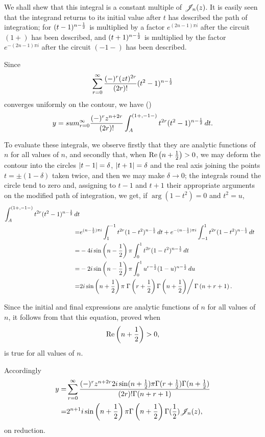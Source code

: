 \documentclass{book}
\begin{document}
We shall shew that this integral is a constant multiple of $\mathscr{J}_n(z)$.
It is easily seen that the integrand returns to its initial value
after $t$ has described the path of integration; for
$(t-1)^{n-\frac{1}{2}}$ is multiplied by a factor
$e^{(2n-1)\pi i}$ after the circuit $(1+)$ has been described, and
$(t+1)^{n-\frac{1}{2}}$ is multiplied by the factor
$e^{-(2n-1)\pi i}$ after the circuit $(-1-)$ has been described.

Since
$$
\sum_{r=0}^{\infty}
\frac{(-)^r (zt)^{2r}}{(2r)!}
(t^2-1)^{n-\frac{1}{2}}
$$
converges uniformly on the contour, we have ()
$$
y
=
sum_{r=0}^{\infty}
\frac{(-)^r z^{n+2r}}{(2r)!}
\int_A^{(1+,-1-)}
t^{2r}
(t^2-1)^{n-\frac{1}{2}}
\, d t.
$$

To evaluate these integrals, we observe firstly that they are analytic
functions of $n$ for all values of $n$, and secondly that, when
$\mathrm{Re}\left( n+\frac{1}{2} \right) > 0$, we may deform the contour into the
circles $\left| t-1 \right|=\delta$, $\left| t+1 \right|=\delta$ and the real axis
joining the points $t = \pm (1-\delta)$ taken twice, and then we may
make $\delta \rightarrow 0$; the integrals round the circle tend to
zero and, assigning to $t-1$
%
%
and $t+1$ their appropriate arguments on the modified path of
integration, we get, if $\arg (1-t^2) = 0$ and $t^2 = u$,
\begin{align*}
  \int_A^{(1+,-1-)}
  t^{2r} (t^2-1)^{n-\frac{1}{2}} \, d t
  \\
  =&
  e^{(n-\frac{1}{2}) \pi i}
  \int_1^{-1} t^{2r} (1-t^2)^{n-\frac{1}{2}} \, d t
  + e^{-(n-\frac{1}{2}) \pi i}
  \int_{-1}^1 t^{2r} (1-t^2)^{n-\frac{1}{2}} \, d t
  \\
  =&
  -4i
  \sin\left( n-\frac{1}{2} \right) 
  \pi
  \int_0^1 t^{2r} (1-t^2)^{n-\frac{1}{2}} \, d t
  \\
  =&
  -2i \sin\left( n-\frac{1}{2} \right)
  \pi
  \int_0^1 u^{r-\frac{1}{2}} (1-u)^{n-\frac{1}{2}} \, d u
  \\
  =&
  2i \sin\left(  n + \frac{1}{2}  \right)
  \pi
  \left.
    \Gamma \left( r + \frac{1}{2} \right)
    \Gamma \left(  n + \frac{1}{2}   \right)
  \right/
  \Gamma \left(  n + r + 1   \right).
\end{align*}

Since the initial and final expressions are analytic functions of $n$
for all values of $n$, it follows from  that this
equation, proved when
$$
\mathrm{Re} \left(  n + \frac{1}{2}  \right) > 0,
$$
is true for all values of $n$.

Accordingly
\begin{align*}
  y
  =&
  \sum_{r=0}^{\infty}
  \frac{(-)^r z^{n+2r} 2i \sin(n+\frac{1}{2}) \pi \Gamma(r+\frac{1}{2})
    \Gamma(n+\frac{1}{2})}{ (2r)! \Gamma(n+r+1)}
  \\
  =&
  2^{n+1}
  i
  \sin\left( n+\frac{1}{2} \right)
  \pi
  \Gamma\left( n+\frac{1}{2} \right)
  \Gamma(\frac{1}{2})
  \mathscr{J}_n(z),
\end{align*}
on reduction.
\end{document}
